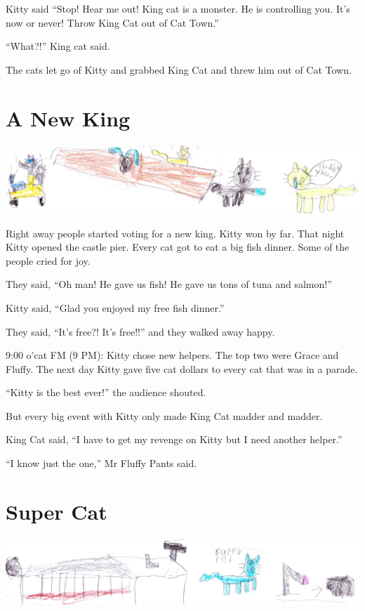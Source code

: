 \documentclass[12pt,oneside]{krantz}
\begin{document}
Kitty said ``Stop! Hear me out! King cat is a monster. He is controlling
you. It's now or never! Throw King Cat out of Cat Town.''

``What?!'' King cat said.

The cats let go of Kitty and grabbed King Cat and threw him out of Cat
Town.

\hypertarget{a-new-king}{%
\chapter{A New King}\label{a-new-king}}

\includegraphics{img/thankyou.jpg}

Right away people started voting for a new king. Kitty won by far. That
night Kitty opened the castle pier. Every cat got to eat a big fish
dinner. Some of the people cried for joy.

They said, ``Oh man! He gave us fish! He gave us tons of tuna and
salmon!''

Kitty said, ``Glad you enjoyed my free fish dinner.''

They said, ``It's free?! It's free!!'' and they walked away happy.

9:00 o'cat FM (9 PM): Kitty chose new helpers. The top two were Grace
and Fluffy. The next day Kitty gave five cat dollars to every cat that
was in a parade.

``Kitty is the best ever!'' the audience shouted.

But every big event with Kitty only made King Cat madder and madder.

King Cat said, ``I have to get my revenge on Kitty but I need another
helper.''

``I know just the one,'' Mr Fluffy Pants said.

\hypertarget{super-cat}{%
\chapter{Super Cat}\label{super-cat}}

\includegraphics{img/supercat.jpg}
\end{document}
